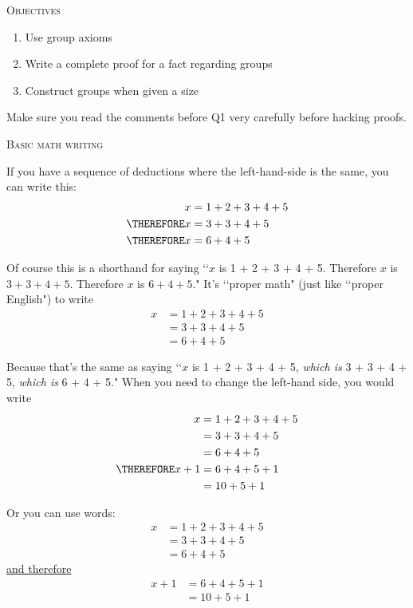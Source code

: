 



\renewcommand\AUTHOR{Christian Elliott}
\renewcommand\EMAIL{cdelliott1@cougars.ccis.edu}
\renewcommand\TITLE{Assignment 4}

\renewcommand{\thethm}{\arabic{thm}}%


\topmatter

\textsc{Objectives}
\begin{enumerate}[nosep]
\item Use group axioms
\item Write a complete proof for a fact regarding groups
\item Construct groups when given a size 
\end{enumerate}

Make sure you read the comments before Q1 very carefully
before hacking proofs.

\newpage
\textsc{Basic math writing}

If you have a sequence of deductions where the left-hand-side is the same,
you can write this:
\begin{align*}
x &= 1 + 2 + 3 + 4 + 5 \\
\THEREFORE x &= 3 + 3 + 4 + 5 \\
\THEREFORE x &= 6 + 4 + 5
\end{align*}

Of course this is a shorthand for saying
\lq\lq $x$ is 1 + 2 + 3 + 4 + 5.
Therefore $x$ is $3 + 3 + 4 + 5$.
Therefore $x$ is $6 + 4 + 5$."
It's \lq\lq proper math" (just like \lq\lq proper English") to write
\begin{align*}
x &= 1 + 2 + 3 + 4 + 5 \\
&= 3 + 3 + 4 + 5 \\
&= 6 + 4 + 5 
\end{align*}

Because that's the same as saying
\lq\lq $x$ is 1 + 2 + 3 + 4 + 5, \textit{which is} 3 + 3 + 4 + 5,
\textit{which is} 6 + 4 + 5."
When you need to change the left-hand side,
you would write
\begin{align*}
x &= 1 + 2 + 3 + 4 + 5 \\
&= 3 + 3 + 4 + 5 \\
&= 6 + 4 + 5 \\
\THEREFORE x + 1
&= 6 + 4 + 5 + 1\\
&= 10 + 5 + 1
\end{align*}

Or you can use words:
\begin{align*}
x &= 1 + 2 + 3 + 4 + 5 \\
&= 3 + 3 + 4 + 5 \\
&= 6 + 4 + 5
\end{align*}
\underline{and therefore}
\begin{align*}
x + 1
&= 6 + 4 + 5 + 1\\
&= 10 + 5 + 1
\end{align*}

